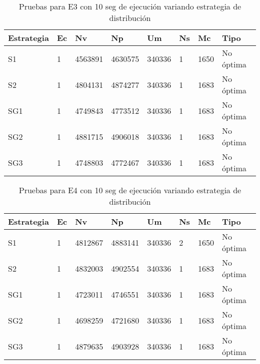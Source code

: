 \begin{center}
\begin{longtable}{|p{3cm}|p{1.0cm}|p{1.6cm}|p{1.6cm}|p{1.1cm}|p{1.1cm}|p{1.1cm}|p{2.7cm}|}
	\caption{Pruebas para E3 con 10 seg de ejecución variando estrategia de distribución} \\
	\hline
	\cellcolor[gray]{0.9} \textbf{Estrategia} & \cellcolor[gray]{0.9}\textbf{Ec} & \cellcolor[gray]{0.9}\textbf{Nv} & \cellcolor[gray]{0.9}\textbf{Np} & \cellcolor[gray]{0.9}\textbf{Um} & \cellcolor[gray]{0.9}\textbf{Ns} &  \cellcolor[gray]{0.9}\textbf{Mc} & \cellcolor[gray]{0.9}\textbf{Tipo}\\	\hline
	S1& 1 &4563891  &4630575 &340336  &1 &1650&No óptima \\
	\hline
	S2& 1 &4804131  &4874277 &340336  &1 &1683&No óptima \\
	\hline
	SG1& 1 &4749843  &4773512 &340336  &1 &1683&No óptima \\
	\hline
	SG2& 1 &4881715  &4906018 &340336  &1 &1683&No óptima \\
	\hline
	SG3& 1 &4748803  &4772467 &340336  &1 &1683&No óptima \\
	\hline
\end{longtable}	
\end{center}

\begin{center}
\begin{longtable}{|p{3cm}|p{1.0cm}|p{1.6cm}|p{1.6cm}|p{1.1cm}|p{1.1cm}|p{1.1cm}|p{2.7cm}|}
	\caption{Pruebas para E4 con 10 seg de ejecución variando estrategia de distribución} \\
	\hline
	\cellcolor[gray]{0.9} \textbf{Estrategia} & \cellcolor[gray]{0.9}\textbf{Ec} & \cellcolor[gray]{0.9}\textbf{Nv} & \cellcolor[gray]{0.9}\textbf{Np} & \cellcolor[gray]{0.9}\textbf{Um} & \cellcolor[gray]{0.9}\textbf{Ns} &  \cellcolor[gray]{0.9}\textbf{Mc} & \cellcolor[gray]{0.9}\textbf{Tipo}\\	\hline
	S1& 1 &4812867  &4883141 &340336  &2 &1650&No óptima \\
	\hline
	S2& 1 &4832003  &4902554 &340336  &1 &1683&No óptima \\
	\hline
	SG1& 1 &4723011  &4746551 &340336  &1 &1683&No óptima \\
	\hline
	SG2& 1 &4698259  &4721680 &340336  &1 &1683&No óptima \\
	\hline
	SG3& 1 &4879635  &4903928 &340336  &1 &1683&No óptima \\
	\hline
\end{longtable}	
\end{center}


